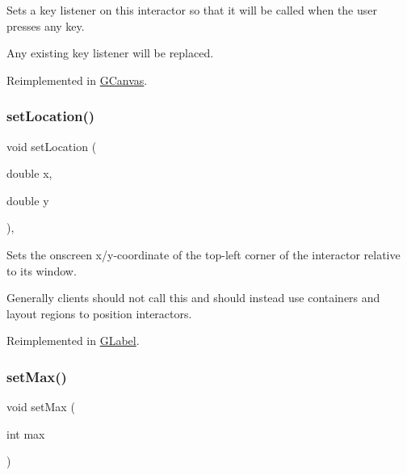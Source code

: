 Sets a key listener on this interactor so that it will be called when the user presses any key. 

Any existing key listener will be replaced. 

Reimplemented in \mbox{\hyperlink{classGCanvas_a1320ed9889a730dfead04a334463ecf3}{G\+Canvas}}.

\mbox{\label{classGInteractor_a04594e8ba9b98513a64f1da00dcae18c}} 
\subsubsection{\texorpdfstring{set\+Location()}{setLocation()}}
{\footnotesize\ttfamily void set\+Location (\begin{DoxyParamCaption}\item[{double}]{x,  }\item[{double}]{y }\end{DoxyParamCaption})\hspace{0.3cm}{\ttfamily [virtual]}, {\ttfamily [inherited]}}



Sets the onscreen x/y-\/coordinate of the top-\/left corner of the interactor relative to its window. 

Generally clients should not call this and should instead use containers and layout regions to position interactors. 

Reimplemented in \mbox{\hyperlink{classGLabel_ae3b17c0aeb355dc23c4e4cbf066e81f7}{G\+Label}}.

\mbox{\label{classGScrollBar_ab263d79bf430d73a617641f317dcfb98}} 
\subsubsection{\texorpdfstring{set\+Max()}{setMax()}}
{\footnotesize\ttfamily void set\+Max (\begin{DoxyParamCaption}\item[{int}]{max }\end{DoxyParamCaption})\hspace{0.3cm}{\ttfamily [virtual]}}



